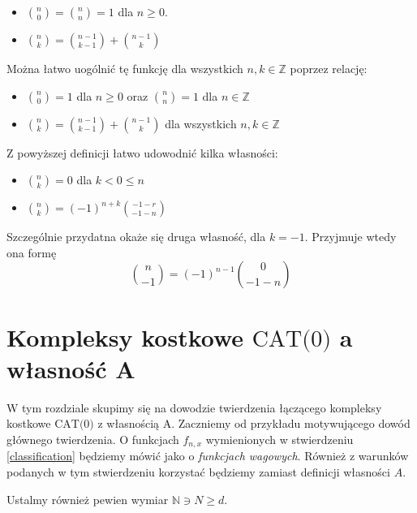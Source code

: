 \documentclass[licencjacka]{pracamgr}
\theoremstyle{definition}
\theoremstyle{definition}
\theoremstyle{definition}
\theoremstyle{definition}
\theoremstyle{definition}
\theoremstyle{plain}
\theoremstyle{plain}
\begin{document}
\begin{itemize}
	\item $ {n \choose 0} = {n \choose n} = 1 $ dla $ n \geq 0 $.
	\item $ {n \choose k} = {n-1 \choose k-1} + {n-1 \choose k} $
\end{itemize}

Można łatwo uogólnić tę funkcję dla wszystkich $ n,k \in \mathbb{Z} $ poprzez relację:

\begin{itemize}
	\item $ {n \choose 0} = 1  $ dla $ n \geq 0$ oraz $ {n \choose n} = 1  $ dla 
	$ n \in \mathbb{Z}$
	\item $ {n \choose k} = {n -1 \choose k-1} + {n-1 \choose k} $ dla wszystkich $ n,k \in
	\mathbb{Z} $
\end{itemize}

Z powyższej definicji łatwo udowodnić kilka własności:

\begin{itemize}
	\item ${n \choose k} = 0$ dla $ k < 0 \leq n $
	\item $ {n \choose k} = (-1)^{n+k}{-1-r \choose -1-n} $
\end{itemize}

Szczególnie przydatna okaże się druga własność, dla $ k = -1 $. Przyjmuje wtedy ona formę 
$$ {n \choose -1} = (-1)^{n-1} {0 \choose -1-n} $$

\chapter{Kompleksy kostkowe $ \text{CAT(0)} $ a własność A}

W tym rozdziale skupimy się na dowodzie twierdzenia łączącego kompleksy kostkowe 
$ \text{CAT(0)} $ z własnością A. Zaczniemy od przykładu motywującego dowód głównego 
twierdzenia. O funkcjach $ f_{n,x} $ wymienionych w stwierdzeniu \ref{classification} 
będziemy mówić jako o 
\textit{funkcjach wagowych}. Również z warunków podanych w tym stwierdzeniu korzystać 
będziemy zamiast definicji własności $A$.

Ustalmy również pewien wymiar $\mathbb{N} \ni N \geq d $. 
\end{document}

